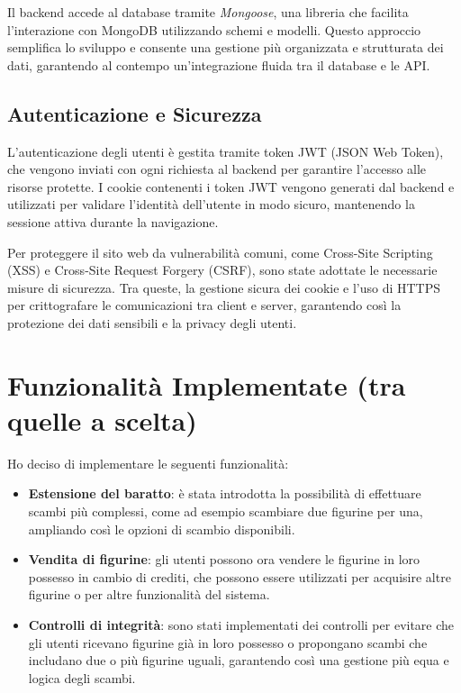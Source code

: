 \documentclass{article}
\begin{document}
    Il backend accede al database tramite \textit{Mongoose}, una libreria che facilita l'interazione con MongoDB utilizzando schemi e modelli. Questo approccio semplifica lo sviluppo e consente una gestione più organizzata e strutturata dei dati, garantendo al contempo un'integrazione fluida tra il database e le API.
    
    \subsection*{Autenticazione e Sicurezza}
    L'autenticazione degli utenti è gestita tramite token JWT (JSON Web Token), che vengono inviati con ogni richiesta al backend per garantire l'accesso alle risorse protette. I cookie contenenti i token JWT vengono generati dal backend e utilizzati per validare l'identità dell'utente in modo sicuro, mantenendo la sessione attiva durante la navigazione.
    
    Per proteggere il sito web da vulnerabilità comuni, come Cross-Site Scripting (XSS) e Cross-Site Request Forgery (CSRF), sono state adottate le necessarie misure di sicurezza. Tra queste, la gestione sicura dei cookie e l'uso di HTTPS per crittografare le comunicazioni tra client e server, garantendo così la protezione dei dati sensibili e la privacy degli utenti.
    
\section{Funzionalità Implementate (tra quelle a scelta)}
    Ho deciso di implementare le seguenti funzionalità:
    
    \begin{itemize}
        \item \textbf{Estensione del baratto}: è stata introdotta la possibilità di effettuare scambi più complessi, come ad esempio scambiare due figurine per una, ampliando così le opzioni di scambio disponibili.
        \item \textbf{Vendita di figurine}: gli utenti possono ora vendere le figurine in loro possesso in cambio di crediti, che possono essere utilizzati per acquisire altre figurine o per altre funzionalità del sistema.
        \item \textbf{Controlli di integrità}: sono stati implementati dei controlli per evitare che gli utenti ricevano figurine già in loro possesso o propongano scambi che includano due o più figurine uguali, garantendo così una gestione più equa e logica degli scambi.
    \end{itemize}
\end{document}
